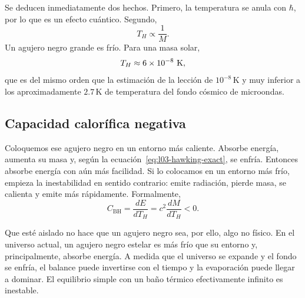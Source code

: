 Se deducen inmediatamente dos hechos. Primero, la temperatura se anula con \(\hbar\), por lo que es un efecto cuántico. Segundo,
\begin{equation}
T_H\propto\frac{1}{M}.
\end{equation}
Un agujero negro grande es frío. Para una masa solar,
\begin{equation}
T_H\approx6\times10^{-8}\ {\rm K},
\end{equation}
que es del mismo orden que la estimación de la lección de \(10^{-8}\,\mathrm{K}\) y muy inferior a los aproximadamente \(2.7\,\mathrm{K}\) de temperatura del fondo cósmico de microondas.

\subsection{Capacidad calorífica negativa}

Coloquemos ese agujero negro en un entorno más caliente. Absorbe energía, aumenta su masa y, según la ecuación~\eqref{eq:l03-hawking-exact}, se enfría. Entonces absorbe energía con aún más facilidad. Si lo colocamos en un entorno más frío, empieza la inestabilidad en sentido contrario: emite radiación, pierde masa, se calienta y emite más rápidamente. Formalmente,
\begin{equation}
C_{\mathrm{BH}}
=\frac{dE}{dT_H}
=c^2\frac{dM}{dT_H}
<0.
\end{equation}

\begin{classroomqa}
\end{classroomqa}

Que esté aislado no hace que un agujero negro sea, por ello, algo no físico. En el universo actual, un agujero negro estelar es más frío que su entorno y, principalmente, absorbe energía. A medida que el universo se expande y el fondo se enfría, el balance puede invertirse con el tiempo y la evaporación puede llegar a dominar. El equilibrio simple con un baño térmico efectivamente infinito es inestable.

